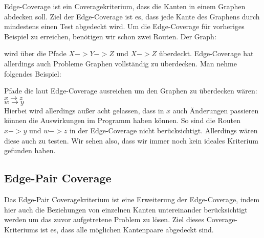 Edge-Coverage ist ein Coveragekriterium, dass die Kanten in einem Graphen abdecken soll.
Ziel der Edge-Coverage ist es, dass jede Kante des Graphens durch mindestens einen Test abgedeckt wird.
Um die Edge-Coverage für vorheriges Beispiel zu erreichen, benötigen wir schon zwei Routen.
Der Graph:


wird über die Pfade $X -> Y -> Z$ und $X -> Z$ überdeckt.
Edge-Coverage hat allerdings auch Probleme Graphen vollständig zu überdecken.
Man nehme folgendes Beispiel:


Pfade die laut Edge-Coverage ausreichen um den Graphen zu überdecken wären: \\
$ x \rightarrow z $ \\
$ w \rightarrow y $ \\
Hierbei wird allerdings außer acht gelassen, dass in $x$ auch Änderungen passieren können die Auswirkungen im Programm haben können.
So sind die Routen $ x -> y $ und $ w -> z $ in der Edge-Coverage nicht berücksichtigt.
Allerdings wären diese auch zu testen.
Wir sehen also, dass wir immer noch kein ideales Kriterium gefunden haben.


\subsection{Edge-Pair Coverage}

Das Edge-Pair Coveragekriterium ist eine Erweiterung der Edge-Coverage, indem hier auch die Beziehungen von einzelnen Kanten untereinander berücksichtigt werden um das zuvor
aufgetretene Problem zu lösen.
Ziel dieses Coverage-Kriteriums ist es, dass alle möglichen Kantenpaare abgedeckt sind.





